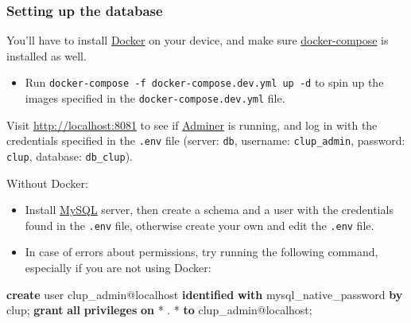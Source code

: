 \documentclass[
]{article}
\newenvironment{Shaded}{}{}
\newcommand{\FunctionTok}[1]{\textcolor[rgb]{0.02,0.16,0.49}{#1}}
\newcommand{\KeywordTok}[1]{\textcolor[rgb]{0.00,0.44,0.13}{\textbf{#1}}}
\newcommand{\NormalTok}[1]{#1}
\newcommand{\OperatorTok}[1]{\textcolor[rgb]{0.40,0.40,0.40}{#1}}
\newcommand{\StringTok}[1]{\textcolor[rgb]{0.25,0.44,0.63}{#1}}
\begin{document}
\hypertarget{setting-up-the-database}{%
\subsubsection{Setting up the database}\label{setting-up-the-database}}

You'll have to install \href{https://www.docker.com/}{Docker} on your
device, and make sure
\href{https://docs.docker.com/compose/install/}{docker-compose} is
installed as well.

\begin{itemize}

\item
  Run \texttt{docker-compose\ -f\ docker-compose.dev.yml\ up\ -d} to spin up the images specified in
  the \texttt{docker-compose.dev.yml} file.
\end{itemize}

Visit \url{http://localhost:8081} to see if
\href{https://www.adminer.org}{Adminer} is running, and log in with the
credentials specified in the \texttt{.env} file (server: \texttt{db},
username: \texttt{clup\_admin}, password: \texttt{clup}, database:
\texttt{db\_clup}).

Without Docker:

\begin{itemize}

\item
  Install \href{https://www.mysql.com}{MySQL} server, then create a
  schema and a user with the credentials found in the \texttt{.env}
  file, otherwise create your own and edit the \texttt{.env} file.
\end{itemize}


\begin{itemize}

\item
  In case of errors about permissions, try running the following
  command, especially if you are not using Docker:
\end{itemize}

\begin{Shaded}
\begin{Highlighting}[]
\KeywordTok{create} \FunctionTok{user}\NormalTok{ clup\_admin@localhost }\KeywordTok{identified} \KeywordTok{with}\NormalTok{ mysql\_native\_password }\KeywordTok{by} \StringTok{\textquotesingle{}clup\textquotesingle{}}\NormalTok{;}
\KeywordTok{grant} \KeywordTok{all} \KeywordTok{privileges} \KeywordTok{on} \OperatorTok{*}\NormalTok{ . }\OperatorTok{*} \KeywordTok{to}\NormalTok{ clup\_admin@localhost;}
\end{Highlighting}
\end{Shaded}
\end{document}
